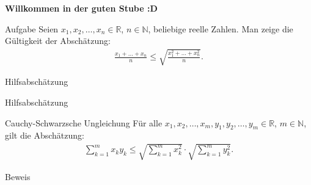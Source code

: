 \documentclass[10pt]{beamer}
\title{}
\author{Artur's Mathematikstübchen}
\date{}
\def\bN{\mathbb{N}}
\def\bR{\mathbb{R}}
\begin{document}

\begin{frame}
    \begin{center}
        \textbf{\huge Willkommen in der guten Stube \newline \newline :D}
    \end{center}
\end{frame}




\begin{frame}
    \begin{alertblock}{Aufgabe}
        Seien \( x_{1}, x_{2}, \ldots, x_{n} \in \bR \), \( n \in \bN \), beliebige reelle Zahlen. Man zeige die Gültigkeit der Abschätzung:
        \begin{align*}
            \frac{x_{1} + \ldots + x_{n}}{n}
            \leq \sqrt{\frac{x_{1}^{2} + \ldots + x_{n}^{2}}{n}}.
        \end{align*}
    \end{alertblock}
\end{frame}



\begin{frame}{Hilfsabschätzung}
    
\end{frame}



\begin{frame}{Hilfsabschätzung}
    \begin{block}{Cauchy-Schwarzsche Ungleichung}
        Für alle \( x_{1}, x_{2}, \ldots, x_{m}, y_{1}, y_{2}, \ldots, y_{m} \in \bR \), \( m \in \bN \), gilt die Abschätzung:
        \begin{align*}
            \sum_{k = 1}^{m} x_{k} y_{k}
            \leq \sqrt{\sum_{k = 1}^{m} x_{k}^{2}} \cdot \sqrt{\sum_{k = 1}^{m} y_{k}^{2}}.
        \end{align*}
    \end{block}
\end{frame}



\begin{frame}{Beweis}
    
\end{frame}
\end{document}
